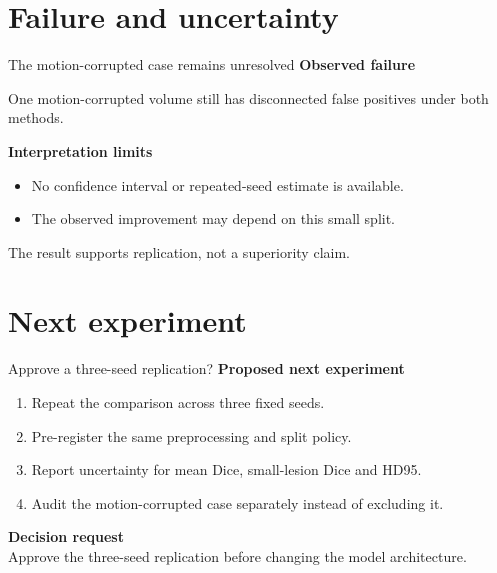 \documentclass[aspectratio=169]{beamer}
\begin{document}
\section{Failure and uncertainty}
\begin{frame}{The motion-corrupted case remains unresolved}
\textbf{Observed failure}
\par\medskip
One motion-corrupted volume still has disconnected false positives under both methods.
\par\bigskip
\textbf{Interpretation limits}
\begin{itemize}
\item No confidence interval or repeated-seed estimate is available.
\item The observed improvement may depend on this small split.
\end{itemize}
\medskip
The result supports replication, not a superiority claim.
\end{frame}
\section{Next experiment}
\begin{frame}{Approve a three-seed replication?}
\textbf{Proposed next experiment}
\begin{enumerate}
\item Repeat the comparison across three fixed seeds.
\item Pre-register the same preprocessing and split policy.
\item Report uncertainty for mean Dice, small-lesion Dice and HD95.
\item Audit the motion-corrupted case separately instead of excluding it.
\end{enumerate}
\vspace{0.8em}
\textbf{Decision request}\\[0.3em]
Approve the three-seed replication before changing the model architecture.
\end{frame}
\end{document}
